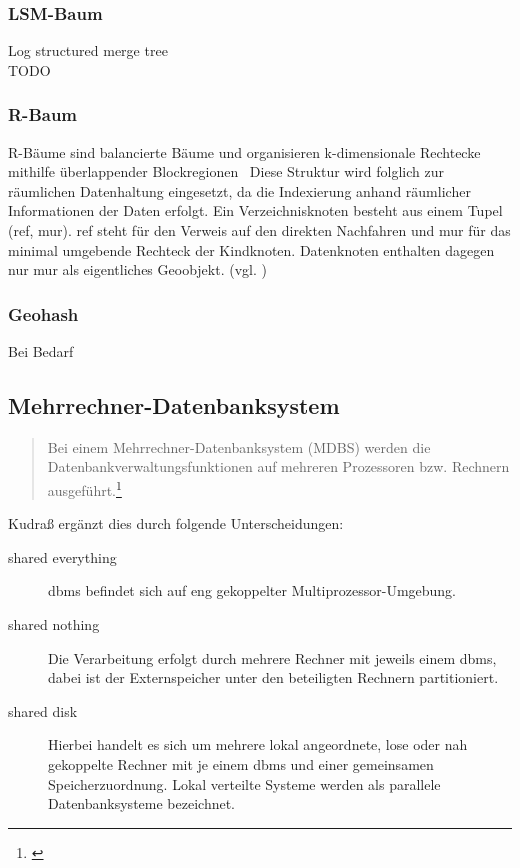 \subsubsection{LSM-Baum}
Log structured merge tree\\
TODO

\subsubsection{R-Baum}
R-Bäume sind balancierte Bäume und \glqq organisieren k-dimensionale Rechtecke mithilfe überlappender Blockregionen\grqq \ \cite[S. 523]{book:kudrass}
Diese Struktur wird folglich zur räumlichen Datenhaltung eingesetzt, da die Indexierung anhand räumlicher Informationen der Daten erfolgt.
Ein Verzeichnisknoten besteht aus einem Tupel (ref, mur).
ref steht für den Verweis auf den direkten Nachfahren und mur für das minimal umgebende Rechteck der Kindknoten.
Datenknoten enthalten dagegen nur mur als eigentliches Geoobjekt. (vgl. \cite[S.523 ff.]{book:kudrass})

\subsubsection{Geohash}
\label{geohash}
Bei Bedarf

\subsection{Mehrrechner-Datenbanksystem}

\begin{quote}
Bei einem Mehrrechner-Datenbanksystem (MDBS) werden die Datenbankverwaltungsfunktionen auf mehreren Prozessoren bzw. Rechnern ausgeführt.\footnote{\cite[S.394]{book:kudrass}}
\end{quote}
Kudraß ergänzt dies durch folgende Unterscheidungen:
\begin{description}
\item[shared everything] \Gls{dbms} befindet sich auf eng gekoppelter Multiprozessor-Umgebung.
\item[shared nothing] Die Verarbeitung erfolgt durch mehrere Rechner mit jeweils einem \Gls{dbms}, dabei ist der Externspeicher unter den beteiligten Rechnern partitioniert.
\item[shared disk] Hierbei handelt es sich um mehrere lokal angeordnete, lose oder nah gekoppelte Rechner mit je einem \Gls{dbms} und einer gemeinsamen Speicherzuordnung. Lokal verteilte Systeme werden als parallele Datenbanksysteme bezeichnet.
\end{description}

